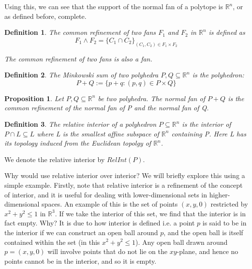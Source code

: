 \documentclass[12pt,a4paper]{report}
\newtheorem{definition}{Definition}
\newtheorem{proposition}{Proposition}
\begin{document}
Using this, we can see that the support of the normal fan of a polytope is $\mathbb R^n$, or as defined before, complete.

\begin{definition}
The \emph{common refinement} of two fans $F_{1}$ and $F_{2}$ in $\mathbb R^{n}$ is defined as
\begin{equation*}
    F_{1} \wedge F_{2} = \{C_{1} \cap C_{2} \}_{(C_{1},C_{2}) \in F_{1} \times F_{2}}
\end{equation*}


The \emph{common refinement} of two fans is also a fan.
\end{definition}

\begin{definition}
The \emph{Minkowski sum} of two polyhedra $P,Q \subseteq \mathbb R^{n}$ is the polyhedron:
\begin{equation*}
    P + Q := \{p + q: (p,q) \in P \times Q \}
\end{equation*}
\end{definition}

\begin{proposition}
Let $P,Q \subseteq \mathbb R^{n}$ be two polyhedra. The normal fan of $P + Q$ is the common refinement of the normal fan of P and the normal fan of Q.
\end{proposition}

\begin{definition}
The \emph{relative interior} of a polyhedron $P \subseteq \mathbb R^{n}$ is the interior of $P \cap L \subseteq L$ where L is the smallest affine subspace of $\mathbb R^{n}$ containing P. Here L has its topology induced from the Euclidean topolgy of $\mathbb R^{n}$.
\end{definition}

We denote the relative interior by $Rel Int(P)$.

Why would use relative interior over interior? We will briefly explore this using a simple example. Firstly, note that relative interior is a refinement of the concept of interior, and it is useful for dealing with lower-dimensional sets in higher-dimensional spaces. An example of this is the set of points $(x, y, 0)$ restricted by $x^2 + y^2 \leq 1$ in $\mathbb{R}^{3}$. If we take the interior of this set, we find that the interior is in fact empty. Why? It is due to how interior is defined i.e. a point $p$ is said to be in the interior if we can construct an open ball around $p$, and the open ball is itself contained within the set (in this $x^2 + y^2 \leq 1$). Any open ball drawn around $p = (x, y, 0)$ will involve points that do not lie on the $xy$-plane, and hence no points cannot be in the interior, and so it is empty.
\end{document}
